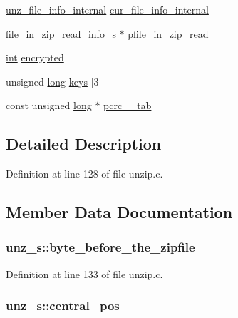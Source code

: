 \begin{DoxyCompactItemize}
\item 
\hyperlink{unzip_8c_a8f7400cb2fdf408412d6f75accea8305}{unz\-\_\-file\-\_\-info\-\_\-internal} \hyperlink{structunz__s_a36625697385b9a675f02a446fa5ba583}{cur\-\_\-file\-\_\-info\-\_\-internal}
\item 
\hyperlink{structfile__in__zip__read__info__s}{file\-\_\-in\-\_\-zip\-\_\-read\-\_\-info\-\_\-s} $\ast$ \hyperlink{structunz__s_a7a5f0568475ad9a36ee2c1f3972406f0}{pfile\-\_\-in\-\_\-zip\-\_\-read}
\item 
\hyperlink{ioapi_8h_a787fa3cf048117ba7123753c1e74fcd6}{int} \hyperlink{structunz__s_ae50c5145b776e6b2d68a078adbb9ad52}{encrypted}
\item 
unsigned \hyperlink{ioapi_8h_a3c7b35ad9dab18b8310343c201f7b27e}{long} \hyperlink{structunz__s_a55d75bacbbaf31b1e796e222c0388f34}{keys} \mbox{[}3\mbox{]}
\item 
const unsigned \hyperlink{ioapi_8h_a3c7b35ad9dab18b8310343c201f7b27e}{long} $\ast$ \hyperlink{structunz__s_a9efa28355c0dec769d07c5a52d70605d}{pcrc\-\_\-\_\-tab}
\end{DoxyCompactItemize}


\subsection{Detailed Description}


Definition at line 128 of file unzip.\-c.



\subsection{Member Data Documentation}
\hypertarget{structunz__s_a788688a8021cbbba6a2ac1765edd362e}{
\subsubsection[{byte\-\_\-before\-\_\-the\-\_\-zipfile}]{ unz\-\_\-s\-::byte\-\_\-before\-\_\-the\-\_\-zipfile}}\label{structunz__s_a788688a8021cbbba6a2ac1765edd362e}


Definition at line 133 of file unzip.\-c.

\hypertarget{structunz__s_a2d8ae4c0975d2057e30b13c3148c27eb}{
\subsubsection[{central\-\_\-pos}]{ unz\-\_\-s\-::central\-\_\-pos}}\label{structunz__s_a2d8ae4c0975d2057e30b13c3148c27eb}


